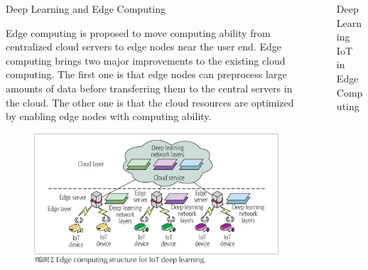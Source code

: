 \documentclass[final]{beamer}
\newlength{\sepwid}
\newlength{\onecolwid}
\newlength{\twocolwid}
\begin{document}
\begin{frame}
\begin{columns}[t]
\begin{column}{\twocolwid}
\begin{columns}[t,totalwidth=\twocolwid]
\begin{column}{\onecolwid}
\begin{exampleblock}{Deep Learning and Edge Computing}

Edge computing is proposed to move computing ability from centralized cloud servers to edge nodes near the user end. Edge computing brings two major improvements to the existing cloud computing. The first one is that edge nodes can preprocess large amounts of data before transferring them to the central servers in the cloud. The other one is that the cloud resources are optimized
by enabling edge nodes with computing ability.
\begin{figure}
\includegraphics[width=1\linewidth]{Resources/Figura-2.jpg}
\end{figure}

\end{exampleblock}


\end{column} %
\begin{column}{\sepwid}\end{column} %

\begin{column}{\onecolwid}\vspace{-.74in} %


\begin{exampleblock}{Deep Learning IoT in Edge Computing}


\end{exampleblock}
\end{column}
\end{columns}
\end{column}
\end{columns}
\end{frame}
\end{document}
